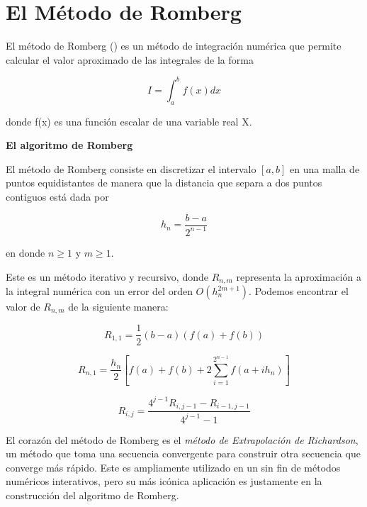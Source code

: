 \section{El Método de Romberg}

\vspace{0.5cm}

El método de Romberg (\cite{scherer2010computational}) es un método de integración numérica que permite calcular el valor aproximado de las integrales de la forma

\begin{equation*}
    I = \displaystyle\int_{a}^{b} f(x)dx
\end{equation*}

\noindent donde f(x) es una función escalar de una variable real X.

\vspace{0.5cm}

\noindent \textbf{El algoritmo de Romberg}

\vspace{0.5cm}

El método de Romberg consiste en discretizar el intervalo $\left[a,b\right]$ en una malla de puntos equidistantes de manera que la distancia que separa a dos puntos contiguos está dada por 

\begin{equation*}
    h_n = \frac{b-a}{2^{n-1}}
\end{equation*}

\noindent en donde $n \ge 1 $ y $ m \ge 1$.

\vspace{0.5cm}

Este es un método iterativo y recursivo, donde $R_{n,m}$ representa la aproximación a la integral numérica con un error del orden $O(h_{n}^{2m+1})$. Podemos encontrar el valor de $R_{n,m}$ de la siguiente manera:

\begin{equation*}
    R_{1,1} = \frac{1}{2} \left(b-a\right) (f\left(a\right) + f\left(b\right))
\end{equation*}

\begin{equation*}
    R_{n,1} = \frac{h_n}{2} \left[ f\left( a \right) + f\left(b\right) + 2 \displaystyle\sum_{i=1}^{2^{n-1}} f\left(a+ih_n\right) \right]
\end{equation*}

\begin{equation*}
    R_{i,j} = \frac{ 4^{ j-1 } R_{ i, j-1} - R_{ i-1, j-1} }{ 4^{ j-1} -1}
\end{equation*}

El corazón del método de Romberg es el \emph{método de Extrapolación de Richardson}, un método que toma una secuencia convergente para construir otra secuencia que converge más rápido. Este es ampliamente utilizado en un sin fin de métodos numéricos interativos, pero su más icónica aplicación es justamente en la construcción del algoritmo de Romberg.
